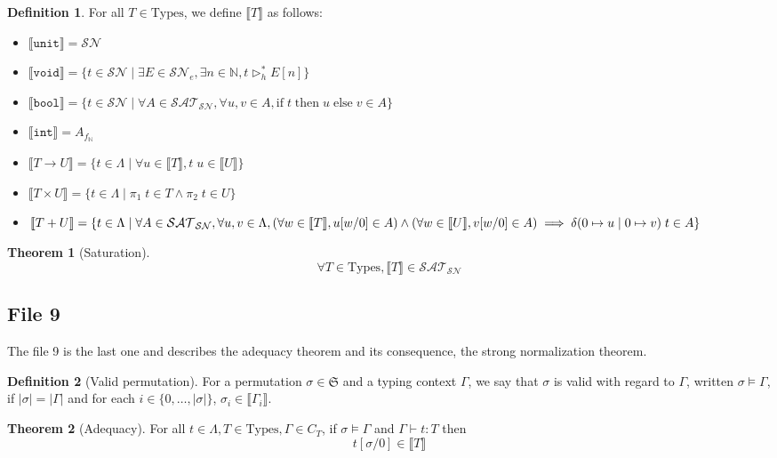 \documentclass{article}
\newcommand{\SN}[0]{\mathcal{SN}}
\renewcommand{\int}[0]{\texttt{int}}
\newcommand{\bool}[0]{\texttt{bool}}
\newcommand{\unit}[0]{\texttt{unit}}
\newcommand{\void}[0]{\texttt{void}}
\newcommand{\ife}[3]{\mathrm{if}\;#1\;\mathrm{then}\;#2\;\mathrm{else}\;#3}
\newcommand{\bN}[0]{\mathbb N}
\newcommand{\deltacase}[3]{\delta(0\mapsto #1\mid 0 \mapsto #2)\;#3}
\newcommand{\fS}[0]{\mathfrak S}
\newcommand{\Types}[0]{\mathrm{Types}}
\newcommand{\SAT}[0]{\mathcal{SAT}_{\mathcal{SN}}}
\theoremstyle{definition}
\newtheorem{defi}{Definition}
\newtheorem{them}{Theorem}
\begin{document}
\begin{defi}
    For all $T\in\Types$, we define $\llbracket T \rrbracket$ as follows:
    \begin{itemize}
        \item $\llbracket\unit\rrbracket = \SN$
        \item $\llbracket\void\rrbracket = \{ t \in \SN\mid \exists E \in \SN_e, \exists n \in \bN, t
        \rhd_h^* E[n]\}$
        \item $\llbracket\bool\rrbracket = \{ t \in \SN\mid \forall A\in\SAT, \forall u,v\in A,
        \ife{t}{u}{v}\in A\}$
        \item $\llbracket\int\rrbracket = A_{f_\bN}$
        \item $\llbracket T \to U\rrbracket = \{ t \in \Lambda\mid \forall u \in \llbracket T\rrbracket,
        t\;u\in\llbracket U \rrbracket\}$
        \item $\llbracket T \times U \rrbracket = \{ t \in \Lambda\mid \pi_1\;t\in T\land \pi_2\;t\in U \}$
        \item $\llbracket T + U \rrbracket = \{ t \in \Lambda\mid \forall A \in\SAT, \forall u,v\in \Lambda,
        (\forall w\in \llbracket T\rrbracket, u[w/0]\in A)\land (\forall w\in \llbracket U\rrbracket,
        v[w/0]\in A) \\\implies \deltacase{u}{v}{t}\in A\}$
    \end{itemize}
\end{defi}

\begin{them}[Saturation]
    $$\forall T \in\Types, \llbracket T \rrbracket \in \SAT$$
\end{them}

\subsection{File 9}

The file 9 is the last one and describes the adequacy theorem and its consequence, the strong normalization
theorem.

\begin{defi}[Valid permutation]
    For a permutation $\sigma\in\fS$ and a typing context $\Gamma$, we say that $\sigma$ is valid with regard
    to $\Gamma$, written $\sigma\models \Gamma$, if $|\sigma| = |\Gamma|$ and for each $i\in \{0,\ldots,
    |\sigma|\}$, $\sigma_i \in \llbracket \Gamma_i\rrbracket$.
\end{defi}

\begin{them}[Adequacy]
    For all $t\in\Lambda,T\in\Types, \Gamma\in C_T$, if $\sigma\models\Gamma$ and $\Gamma\vdash t : T$
    then $$t[\sigma/0]\in\llbracket T \rrbracket$$
\end{them}
\end{document}
